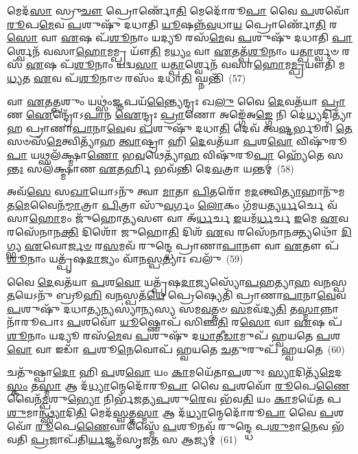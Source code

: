 𑌮𑍇𑌦᳴\-\ul{𑌸𑌾} 𑌸𑍍𑌰𑍁\-\ul{𑌚𑍗} 𑌪𑍍𑌰𑍋𑌰𑍍𑌣𑍋᳴\-\ul{𑌤𑌿} 𑌮𑍇𑌦𑍋᳴𑌰𑍂\-\ul{𑌪𑌾} 𑌵𑍈 \ul{𑌪}\-𑌶𑌵𑍋᳴ \ul{𑌰𑍂}\-𑌪\-\ul{𑌮𑍇}\-𑌵 \ul{𑌪}\-𑌶𑍁𑌷𑍁᳴ 𑌦𑌧𑌾𑌤𑌿 \ul{𑌯𑍂}\-𑌷𑌨𑍍𑌨᳴\-\ul{𑌵}\-𑌧𑌾\-\ul{𑌯} 𑌪𑍍𑌰𑍋𑌰𑍍𑌣𑍋᳴\-\ul{𑌤𑌿} 𑌰\-\ul{𑌸𑍋} 𑌵𑌾 \ul{𑌏}\-𑌷 𑌪᳴\-\ul{𑌶𑍂}\-𑌨𑌾𑌂 𑌯𑌦𑍍𑌯𑍂 𑌰𑌸᳴\-\ul{𑌮𑍇}\-𑌵 \ul{𑌪}\-𑌶𑍁𑌷𑍁᳴ 𑌦𑌧𑌾𑌤𑌿 \ul{𑌪𑌾}\-𑌰𑍍𑌶𑍍𑌵𑍇𑌨᳴ 𑌵𑌸𑌾\-\ul{𑌹𑍋}\-𑌮𑌮𑍍𑌪𑍍𑌰 𑌯𑍗᳴\-\ul{𑌤𑌿} 𑌮\-\ul{𑌧𑍍𑌯𑌂} 𑌵𑌾 \ul{𑌏}\-𑌤𑌤𑍍𑌪᳴\-\ul{𑌶𑍂}\-𑌨𑌾𑌂 𑌯\-\ul{𑌤𑍍𑌪𑌾}\-𑌰𑍍𑌶𑍍𑌵𑍞 𑌰𑌸᳴ \ul{𑌏}\-𑌷 𑌪᳴\-\ul{𑌶𑍂}\-𑌨𑌾𑌂 𑌯𑌦𑍍𑌵\-\ul{𑌸𑌾} 𑌯\-\ul{𑌤𑍍𑌪𑌾}\-𑌰𑍍𑌶𑍍𑌵𑍇𑌨᳴ 𑌵𑌸𑌾\-\ul{𑌹𑍋}\-𑌮\-\ul{𑌮𑍍𑌪𑍍𑌰}\-𑌯𑍗𑌤𑌿᳴ 𑌮\-\ul{𑌧𑍍𑌯}\-𑌤 \ul{𑌏}\-𑌵 𑌪᳴\-\ul{𑌶𑍂}\-𑌨𑌾𑍞 𑌰𑌸𑌂᳴ 𑌦𑌧𑌾\-\ul{𑌤𑌿} 𑌘𑍍𑌨𑌨𑍍𑌤𑌿᳴~(57)

𑌵𑌾 \ul{𑌏}\-𑌤\-\ul{𑌤𑍍𑌪}\-𑌶𑍁𑌂 𑌯𑌥𑍍𑌸𑌂॑\-\ul{𑌜𑍍𑌞}\-𑌪𑌯᳴\-\ul{𑌨𑍍𑌤𑍍𑌯𑍈}\-𑌨𑍍𑌦𑍍𑌰𑌃 𑌖\-\ul{𑌲𑍁} 𑌵𑍈 \ul{𑌦𑍇}\-𑌵𑌤᳴𑌯𑌾 \ul{𑌪𑍍𑌰𑌾}\-𑌣 \ul{𑌐}\-𑌨𑍍𑌦𑍍𑌰𑍋᳴\-𑌽\-\ul{𑌪𑌾}\-𑌨 \ul{𑌐}\-𑌨𑍍𑌦𑍍𑌰𑌃 \ul{𑌪𑍍𑌰𑌾}\-𑌣𑍋 𑌅𑌙𑍍𑌗𑍇᳴𑌅\-\ul{𑌙𑍍𑌗𑍇} 𑌨𑌿 𑌦𑍇॑\-\ul{𑌧𑍍𑌯}\-𑌦𑌿𑌤𑍍𑌯𑌾᳴𑌹 𑌪𑍍𑌰𑌾𑌣𑌾\-\ul{𑌪𑌾}\-𑌨𑌾\-\ul{𑌵𑍇}\-𑌵 \ul{𑌪}\-𑌶𑍁𑌷𑍁᳴ 𑌦𑌧𑌾\-\ul{𑌤𑌿} 𑌦𑍇𑌵᳴ 𑌤𑍍𑌵\-\ul{𑌷𑍍𑌟}\-𑌰𑍍𑌭𑍂𑌰𑌿᳴ \ul{𑌤𑍇} 𑌸𑍞𑌸᳴\-\ul{𑌮𑍇}\-𑌤𑍍𑌵𑌿𑌤𑍍𑌯𑌾᳴𑌹 \ul{𑌤𑍍𑌵𑌾}\-𑌷𑍍𑌟𑍍𑌰𑌾 𑌹𑌿 \ul{𑌦𑍇}\-𑌵𑌤᳴𑌯𑌾 \ul{𑌪}\-𑌶\-\ul{𑌵𑍋} 𑌵𑌿𑌷𑍁᳴𑌰𑍂\-\ul{𑌪𑌾} 𑌯𑌥𑍍𑌸𑌲᳴𑌕𑍍𑌷𑍍𑌮𑌾\-\ul{𑌣𑍋} 𑌭\-\ul{𑌵}\-𑌥𑍇𑌤𑍍𑌯𑌾᳴\-\ul{𑌹} 𑌵𑌿𑌷𑍁᳴𑌰𑍂\-\ul{𑌪𑌾} 𑌹𑍍𑌯𑍇᳴𑌤𑍇 𑌸\-\ul{𑌨𑍍𑌤𑌃} 𑌸𑌲᳴𑌕𑍍𑌷𑍍𑌮𑌾𑌣 \ul{𑌏}\-𑌤𑌰𑍍\mbox{}\-\ul{𑌹𑌿} 𑌭𑌵᳴𑌨𑍍𑌤𑌿 𑌦𑍇\-\ul{𑌵}\-𑌤𑍍𑌰𑌾 𑌯𑌨𑍍𑌤𑌮𑍍॑~(58)

𑌅𑌵᳴\-\ul{𑌸𑍇} 𑌸\-\ul{𑌖𑌾}\-𑌯𑍋\-𑌽𑌨𑍁᳴ 𑌤𑍍𑌵𑌾 \ul{𑌮𑌾}\-𑌤𑌾 \ul{𑌪𑌿}\-𑌤𑌰𑍋᳴ 𑌮\-\ul{𑌦}\-𑌨𑍍𑌤𑍍𑌵𑌿\-\ul{𑌤𑍍𑌯𑌾}\-𑌹𑌾𑌨𑍁᳴𑌮𑌤\-\ul{𑌮𑍇}\-𑌵𑍈𑌨᳴\-\ul{𑌮𑍍𑌮𑌾}\-𑌤𑍍𑌰𑌾 \ul{𑌪𑌿}\-𑌤𑍍𑌰𑌾 𑌸𑍁᳴\-\ul{𑌵}\-𑌰𑍍𑌗𑌂 \ul{𑌲𑍋}\-𑌕𑌂 𑌗᳴𑌮𑌯𑌤𑍍𑌯\-\ul{𑌰𑍍𑌧}\-𑌰𑍍𑌚𑍇 𑌵᳴𑌸𑌾\-\ul{𑌹𑍋}\-𑌮𑌂 𑌜𑍁᳴𑌹𑍋\-\ul{𑌤𑍍𑌯}\-𑌸𑍗 𑌵𑌾 𑌅᳴\-\ul{𑌰𑍍𑌧}\-𑌰𑍍𑌚 \ul{𑌇}\-𑌯𑌮᳴\-\ul{𑌰𑍍𑌧}\-𑌰𑍍𑌚 \ul{𑌇}\-𑌮𑍇 \ul{𑌏}\-𑌵 𑌰𑌸𑍇᳴𑌨𑌾𑌨\-\ul{𑌕𑍍𑌤𑌿} 𑌦𑌿𑌶𑍋᳴ 𑌜𑍁𑌹𑍋\-\ul{𑌤𑌿} 𑌦𑌿𑌶᳴ \ul{𑌏}\-𑌵 𑌰𑌸𑍇᳴𑌨𑌾\-\ul{𑌨}\-𑌕𑍍𑌤𑍍𑌯𑌥𑍋᳴ \ul{𑌦𑌿}\-𑌗𑍍𑌭𑍍𑌯 \ul{𑌏}\-𑌵𑍋\-\ul{𑌰𑍍𑌜}\-\-\ul{𑍞} 𑌰\-\ul{𑌸}\-𑌮𑌵᳴ 𑌰𑍁𑌨𑍍𑌦𑍍𑌧𑍇 𑌪𑍍𑌰𑌾𑌣𑌾\-\ul{𑌪𑌾}\-𑌨𑍗 𑌵𑌾 \ul{𑌏}\-𑌤𑍗 𑌪᳴\-\ul{𑌶𑍂}\-𑌨𑌾𑌂 𑌯𑌤𑍍𑌪𑍃᳴𑌷\-\ul{𑌦𑌾}\-𑌜𑍍𑌯𑌂 𑌵𑌾᳴𑌨\-\ul{𑌸𑍍𑌪}\-𑌤𑍍𑌯𑌾𑌃 𑌖𑌲𑍁᳴~(59)

𑌵𑍈 \ul{𑌦𑍇}\-𑌵𑌤᳴𑌯𑌾 \ul{𑌪}\-𑌶\-\ul{𑌵𑍋} 𑌯𑌤𑍍𑌪𑍃᳴𑌷\-\ul{𑌦𑌾}\-𑌜𑍍𑌯𑌸𑍍𑌯𑍋᳴\-\ul{𑌪}\-𑌹𑌤𑍍𑌯𑌾\-\ul{𑌹} 𑌵\-\ul{𑌨}\-𑌸𑍍𑌪\-\ul{𑌤}\-𑌯𑍇\-𑌽𑌨𑍁᳴ 𑌬𑍍𑌰𑍂\-\ul{𑌹𑌿} 𑌵\-\ul{𑌨}\-𑌸𑍍𑌪𑌤᳴\-\ul{𑌯𑍇} 𑌪𑍍𑌰𑍇𑌷𑍍𑌯𑍇𑌤𑌿᳴ 𑌪𑍍𑌰𑌾𑌣𑌾\-\ul{𑌪𑌾}\-𑌨𑌾\-\ul{𑌵𑍇}\-𑌵 \ul{𑌪}\-𑌶𑍁𑌷𑍁᳴ 𑌦𑌧𑌾\-\ul{𑌤𑍍𑌯}\-𑌨𑍍𑌯𑌸𑍍𑌯𑌾॑𑌨𑍍𑌯𑌸𑍍𑌯 𑌸𑌮\-\ul{𑌵}\-𑌤𑍍𑌤𑍞 \ul{𑌸}\-𑌮𑌵᳴𑌦𑍍𑌯\-\ul{𑌤𑌿} 𑌤\-\ul{𑌸𑍍𑌮𑌾}\-𑌨𑍍𑌨𑌾𑌨𑌾᳴𑌰𑍂𑌪𑌾𑌃 \ul{𑌪}\-𑌶𑌵𑍋᳴ \ul{𑌯𑍂}\-𑌷𑍍𑌣𑍋𑌪᳴ 𑌸𑌿𑌞𑍍𑌚\-\ul{𑌤𑌿} 𑌰\-\ul{𑌸𑍋} 𑌵𑌾 \ul{𑌏}\-𑌷 𑌪᳴\-\ul{𑌶𑍂}\-𑌨𑌾𑌂 𑌯𑌦𑍍𑌯𑍂 𑌰𑌸᳴\-\ul{𑌮𑍇}\-𑌵 \ul{𑌪}\-𑌶𑍁𑌷𑍁᳴ 𑌦\-\ul{𑌧𑌾}\-𑌤𑍀\-\ul{𑌡𑌾}\-𑌮𑍁𑌪᳴ 𑌹𑍍𑌵𑌯𑌤𑍇 \ul{𑌪}\-𑌶\-\ul{𑌵𑍋} 𑌵𑌾 𑌇𑌡𑌾᳴ \ul{𑌪}\-𑌶𑍂\-\ul{𑌨𑍇}\-𑌵𑍋𑌪᳴ 𑌹𑍍𑌵𑌯𑌤𑍇 \ul{𑌚}\-𑌤𑍁𑌰𑍁𑌪᳴ 𑌹𑍍𑌵𑌯𑌤𑍇~(60)

𑌚𑌤𑍁᳴𑌷𑍍𑌪𑌾\-\ul{𑌦𑍋} 𑌹𑌿 \ul{𑌪}\-𑌶\-\ul{𑌵𑍋} 𑌯𑌂 \ul{𑌕𑌾}\-𑌮𑌯𑍇᳴𑌤𑌾\-\ul{𑌪}\-𑌶𑍁𑌃 \ul{𑌸𑍍𑌯𑌾}\-𑌦𑌿𑌤𑍍𑌯᳴\-\ul{𑌮𑍇}\-𑌦\-\ul{𑌸𑍍𑌕𑌂} 𑌤\-\ul{𑌸𑍍𑌮𑌾} 𑌆 𑌦᳴\-\ul{𑌧𑍍𑌯𑌾}\-𑌨𑍍𑌮𑍇𑌦𑍋᳴𑌰𑍂\-\ul{𑌪𑌾} 𑌵𑍈 \ul{𑌪}\-𑌶𑌵𑍋᳴ \ul{𑌰𑍂}\-𑌪𑍇\-\ul{𑌣𑍈}\-𑌵𑍈𑌨᳴\-\ul{𑌮𑍍𑌪}\-𑌶𑍁\-\ul{𑌭𑍍𑌯𑍋} 𑌨𑌿𑌰𑍍𑌭᳴𑌜𑌤𑍍𑌯\-\ul{𑌪}\-𑌶𑍁\-\ul{𑌰𑍇}\-𑌵 𑌭᳴𑌵\-\ul{𑌤𑌿} 𑌯𑌂 \ul{𑌕𑌾}\-𑌮𑌯𑍇᳴𑌤 𑌪\-\ul{𑌶𑍁}\-𑌮𑌾\-\ul{𑌨𑍍𑌥𑍍𑌸𑍍𑌯𑌾}\-𑌦𑌿\-\ul{𑌤𑌿} 𑌮𑍇𑌦᳴\-\ul{𑌸𑍍𑌵}\-𑌤𑍍𑌤\-\ul{𑌸𑍍𑌮𑌾} 𑌆 𑌦᳴\-\ul{𑌧𑍍𑌯𑌾}\-𑌨𑍍𑌮𑍇𑌦𑍋᳴𑌰𑍂\-\ul{𑌪𑌾} 𑌵𑍈 \ul{𑌪}\-𑌶𑌵𑍋᳴ \ul{𑌰𑍂}\-𑌪𑍇\-\ul{𑌣𑍈}\-𑌵𑌾𑌸𑍍𑌮𑍈᳴ \ul{𑌪}\-𑌶𑍂𑌨𑌵᳴ 𑌰𑍁𑌨𑍍𑌦𑍍𑌧𑍇 𑌪\-\ul{𑌶𑍁}\-𑌮𑌾\-\ul{𑌨𑍇}\-𑌵 𑌭᳴𑌵𑌤𑌿 \ul{𑌪𑍍𑌰}\-𑌜𑌾𑌪᳴𑌤𑌿\-\ul{𑌰𑍍𑌯}\-𑌜𑍍𑌞𑌮᳴𑌸𑍃𑌜\-\ul{𑌤} 𑌸 𑌆𑌜𑍍𑌯𑌮𑍍॑~(61)

